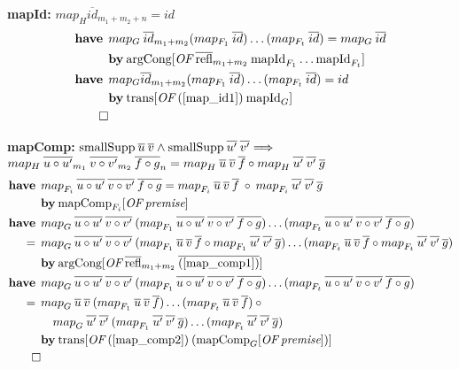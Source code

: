 \newcommand{\have}{\textbf{have}\:\:}
\newcommand{\by}{\textbf{by}\:}

\setcounter{mapId}{0}
\textbf{mapId:} $map_H \overline{id}_{m_1+m_2+n} = id$
\begin{align}
\have & map_G \: \overline{id}_{m_1+m_2} (map_{F_1} \: \overline{id}) \dots (map_{F_t} \: \overline{id}) = map_G \: \overline{id} \label{map_id1} \\*
 & \by \OF{\text{argCong}}{\overline{\text{refl}}_{m_1+m_2} \: \text{mapId}_{F_1} \dots \text{mapId}_{F_t}} \nonumber \\
\have & map_G \overline{id}_{m_1+m_2} (map_{F_1} \: \overline{id}) \dots (map_{F_t} \: \overline{id}) = id \\*
& \by \OF{\text{trans}}{(\ref{map_id1}) \: \text{mapId}_G} \nonumber \\*
\qed \nonumber
\end{align}

\textbf{mapComp:} $\text{smallSupp} \: \overline{u} \: \overline{v} \wedge \text{smallSupp} \: \overline{u'} \: \overline{v'} \Longrightarrow$ \\
\hspace*{1.7em} $map_H \: \overline{u \circ u'}_{m_1} \: \overline{v \circ v'}_{m_2} \: \overline{f \circ g}_n = {map}_{H} \: \overline{u} \: \overline{v} \: \overline{f} \circ {map}_{H} \: \overline{u'} \: \overline{v'} \: \overline{g}$
\begin{align}
\have & \map{F_i}{u \circ u'}{v \circ v'}{f \circ g} = \map{F_i}{u}{v}{f} \: \circ \: \map{F_i}{u'}{v'}{g} \label{map_comp1} \\*
 & \by \OF{\text{mapComp}_{F_i}}{\textit{premise}} \nonumber \\
%
\have & \map{G}{u \circ u'}{v \circ v'}{}(\map{F_1}{u \circ u'}{v \circ v'}{f \circ g})\dots(\map{F_t}{u \circ u'}{v \circ v'}{f \circ g}) \nonumber \\*
= \:\: & \map{G}{u \circ u'}{v \circ v'}{}(\map{F_1}{u}{v}{f} \circ \map{F_1}{u'}{v'}{g})\dots(\map{F_t}{u}{v}{f} \circ \map{F_t}{u'}{v'}{g}) \label{map_comp2} \\*
& \by \OF{\text{argCong}}{\overline{\text{refl}}_{m_1+m_2} \: \overline{(\ref{map_comp1})}} \nonumber \\
%
\have & \map{G}{u \circ u'}{v \circ v'}{}(\map{F_1}{u \circ u'}{v \circ v'}{f \circ g})\dots(\map{F_t}{u \circ u'}{v \circ v'}{f \circ g}) \nonumber \\*
= \:\: & \map{G}{u}{v}{}(\map{F_1}{u}{v}{f})\dots(\map{F_t}{u}{v}{f}) \: \circ \nonumber \\*
& \quad \map{G}{u'}{v'}{}(\map{F_1}{u'}{v'}{g})\dots(\map{F_t}{u'}{v'}{g}) \label{map_comp3} \\*
& \by \OF{\text{trans}}{(\ref{map_comp2}) \: (\OF{\text{mapComp}_G}{\textit{premise}})} \nonumber \\*
\qed \nonumber
\end{align}


